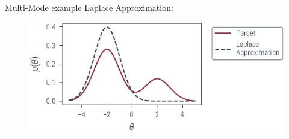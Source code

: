\documentclass{beamer}
\begin{document}
\begin{frame}{Multi-Mode example}
    Laplace Approximation:
    \begin{figure}
        \includegraphics[]{../figures/laplace-approx/mixture-density-laplace.pdf}
    \end{figure}
\end{frame}
\end{document}
